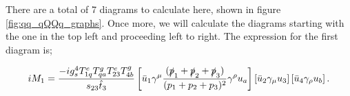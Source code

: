 There are a total of 7 diagrams to calculate here, shown in figure \ref{fig:qq_qQQq_graphs}. Once more, we will calculate the diagrams starting with the one in the top left and proceeding left to right. The expression for the first diagram is;

\begin{equation}
iM_1 = \frac{- i g_s^4 T^e_{1q}T^g_{qa}T^e_{23}T^g_{4b}}{s_{23} \hat{t}_3} \left[ \bar{u}_1 \gamma^\mu \frac{(\slashed{p}_1+\slashed{p}_2 + \slashed{p}_3)}{(p_1 + p_2 + p_3)^2} \gamma^\rho u_a \right] \left[\bar{u}_2 \gamma_\mu u_3 \right] \left[ \bar{u}_4 \gamma_\rho u_b \right].
\end{equation}

\begin{figure}[H] 
\centering
{} 

\end{figure}

